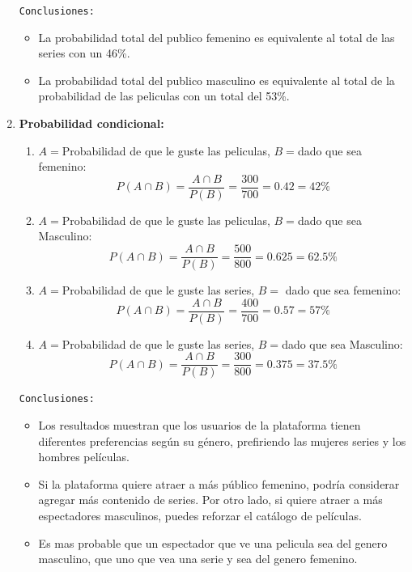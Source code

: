 \documentclass[12pt]{article}
\begin{document}
\begin{enumerate}
                \texttt{Conclusiones:} 
                \begin{itemize}
                    \item La probabilidad total del publico femenino es equivalente al total de las series con un 46\%.
                    \item La probabilidad total del publico masculino es equivalente al total de la probabilidad de las peliculas con un total del 53\%.
                \end{itemize}

            \item \textbf{Probabilidad condicional:}
                \begin{enumerate}
                    \item $A = $Probabilidad de que le guste las peliculas, $B = $dado que sea femenino:
                        \[P(A \cap B) = \frac{A \cap B}{P(B)} = \frac{300}{700} = 0.42 = 42\%\]
                    \item $A = $Probabilidad de que le guste las peliculas, $B = $dado que sea Masculino:
                        \[P(A \cap B) = \frac{A \cap B}{P(B)} = \frac{500}{800} = 0.625 = 62.5\%\]
                    \item $A = $Probabilidad de que le guste las series, $B = $ dado que sea femenino:
                        \[P(A \cap B) = \frac{A \cap B}{P(B)} = \frac{400}{700} = 0.57 = 57 \%\]
                    \item $A = $Probabilidad de que le guste las series, $B = $dado que sea Masculino: 
                        \[P(A \cap B) = \frac{A \cap B}{P(B)} = \frac{300}{800} = 0.375 = 37.5\%\]
                \end{enumerate}
                \texttt{Conclusiones:} 
                \begin{itemize}
                    \item Los resultados muestran que los usuarios de la plataforma tienen diferentes preferencias según su género, prefiriendo las mujeres series y los hombres películas.
                    \item Si la plataforma quiere atraer a más público femenino, podría considerar agregar más contenido de series. Por otro lado, si quiere atraer a más espectadores masculinos, puedes reforzar el catálogo de películas.
                    \item Es mas probable que un espectador que ve una pelicula sea del genero masculino, que uno que vea una serie y sea del genero femenino.
                \end{itemize}
                
        \end{enumerate}
\end{document}
